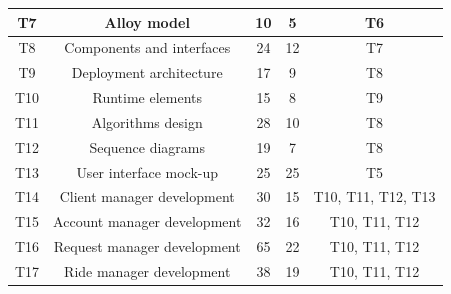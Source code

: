\documentclass[a4paper,11pt]{report} %
\begin{document}
\begin{center}
{\begin{minipage}{\textwidth}
\begin{tabular}{| c | c | c | c | c |}
				\multicolumn{1}{|c|}{T7} & \multicolumn{1}{|c|}{Alloy model} & \multicolumn{1}{|c|}{10} & \multicolumn{1}{|c|}{5} & \multicolumn{1}{|c|}{T6}\\\hline	
				
				\multicolumn{1}{|c|}{T8} & \multicolumn{1}{|c|}{Components and interfaces} & \multicolumn{1}{|c|}{24} & \multicolumn{1}{|c|}{12} & \multicolumn{1}{|c|}{T7}\\\hline		
				
				\multicolumn{1}{|c|}{T9} & \multicolumn{1}{|c|}{Deployment architecture} & \multicolumn{1}{|c|}{17} & \multicolumn{1}{|c|}{9} & \multicolumn{1}{|c|}{T8}\\\hline			
				
				\multicolumn{1}{|c|}{T10} & \multicolumn{1}{|c|}{Runtime elements} & \multicolumn{1}{|c|}{15} & \multicolumn{1}{|c|}{8} & \multicolumn{1}{|c|}{T9}\\\hline			
				
				\multicolumn{1}{|c|}{T11} & \multicolumn{1}{|c|}{Algorithms design} & \multicolumn{1}{|c|}{28} & \multicolumn{1}{|c|}{10} & \multicolumn{1}{|c|}{T8}\\\hline	
				
				\multicolumn{1}{|c|}{T12} & \multicolumn{1}{|c|}{Sequence diagrams} & \multicolumn{1}{|c|}{19} & \multicolumn{1}{|c|}{7} & \multicolumn{1}{|c|}{T8}\\\hline				
		
				\multicolumn{1}{|c|}{T13} & \multicolumn{1}{|c|}{User interface mock-up} & \multicolumn{1}{|c|}{25} & \multicolumn{1}{|c|}{25} & \multicolumn{1}{|c|}{T5}\\\hline		
				
				\multicolumn{1}{|c|}{T14} & \multicolumn{1}{|c|}{Client manager development} & \multicolumn{1}{|c|}{30} & \multicolumn{1}{|c|}{15} & \multicolumn{1}{|c|}{T10, T11, T12, T13}\\\hline	
				
				\multicolumn{1}{|c|}{T15} & \multicolumn{1}{|c|}{Account manager development} & \multicolumn{1}{|c|}{32} & \multicolumn{1}{|c|}{16} & \multicolumn{1}{|c|}{T10, T11, T12}\\\hline
				
				\multicolumn{1}{|c|}{T16} & \multicolumn{1}{|c|}{Request manager development} & \multicolumn{1}{|c|}{65} & \multicolumn{1}{|c|}{22} & \multicolumn{1}{|c|}{T10, T11, T12}\\\hline		
				
				\multicolumn{1}{|c|}{T17} & \multicolumn{1}{|c|}{Ride manager development} & \multicolumn{1}{|c|}{38} & \multicolumn{1}{|c|}{19} & \multicolumn{1}{|c|}{T10, T11, T12}\\\hline	
				

\end{tabular}
\end{minipage}}
\end{center}
\end{document}
